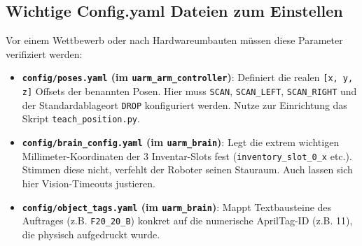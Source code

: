 \documentclass[12pt,a4paper]{article}
\begin{document}
\subsection{Wichtige Config.yaml Dateien zum Einstellen}
Vor einem Wettbewerb oder nach Hardwareumbauten müssen diese Parameter verifiziert werden:
\begin{itemize}
    \item \textbf{\texttt{config/poses.yaml} (im \texttt{uarm\_arm\_controller})}: Definiert die realen \texttt{[x, y, z]} Offsets der benannten Posen. Hier muss \texttt{SCAN}, \texttt{SCAN\_LEFT}, \texttt{SCAN\_RIGHT} und der Standardablageort \texttt{DROP} konfiguriert werden. Nutze zur Einrichtung das Skript \texttt{teach\_position.py}.
    \item \textbf{\texttt{config/brain\_config.yaml} (im \texttt{uarm\_brain})}: Legt die extrem wichtigen Millimeter-Koordinaten der 3 Inventar-Slots fest (\texttt{inventory\_slot\_0\_x} etc.). Stimmen diese nicht, verfehlt der Roboter seinen Stauraum. Auch lassen sich hier Vision-Timeouts justieren.
    \item \textbf{\texttt{config/object\_tags.yaml} (im \texttt{uarm\_brain})}: Mappt Textbausteine des Auftrages (z.B. \texttt{F20\_20\_B}) konkret auf die numerische AprilTag-ID (z.B. 11), die physisch aufgedruckt wurde.
\end{itemize}
\end{document}
